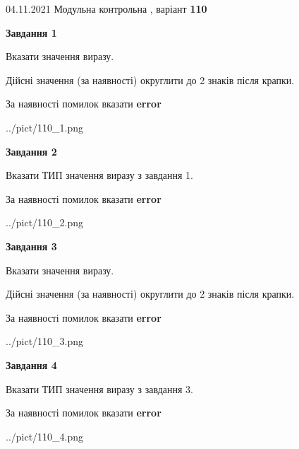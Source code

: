 \documentclass[11pt, ukrainian]{article}
\begin{document}
{04.11.2021 Модульна контрольна , варіант  \No \textbf { 110 }\par}
{
\begin {large}
{\begin {center}\textbf{Завдання 1}\end {center}}\par
Вказати значення виразу. \par
Дійсні значення (за наявності) округлити до 2 знаків після крапки. \par
За наявності помилок вказати \textbf{error}

\begin{center}
	{../pict/110_1.png}
\end{center}
\newpage

{\begin {center}\textbf{Завдання 2}\end {center}}\par
Вказати ТИП значення виразу з завдання 1. \par
За наявності помилок вказати \textbf{error}

\begin{center}
	{../pict/110_2.png}
\end{center}
\newpage

{\begin {center}\textbf{Завдання 3}\end {center}}\par
Вказати значення виразу. \par
Дійсні значення (за наявності) округлити до 2 знаків після крапки. \par
За наявності помилок вказати \textbf{error}

\begin{center}
	{../pict/110_3.png}
\end{center}
\newpage

{\begin {center}\textbf{Завдання 4}\end {center}}\par
Вказати ТИП значення виразу з завдання 3. \par
За наявності помилок вказати \textbf{error}

\begin{center}
	{../pict/110_4.png}
\end{center}
\newpage


\end{large}}
\end{document}
